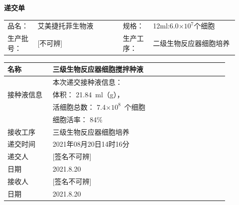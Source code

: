 \documentclass[UTF8,10pt,a4paper,fontset=fandol]{ctexart}
\newcommand{\fieldvalue}[1]{#1}
\newcommand{\handwritten}[1]{#1}
\begin{document}
\begin{center}
\textbf{递交单}

\begin{tabular}{@{}p{0.12\linewidth}p{0.34\linewidth}p{0.12\linewidth}p{0.34\linewidth}@{}}
品名：&
\fieldvalue{艾美捷托菲生物液}
&
规格：&
\fieldvalue{12ml:6.0$\times 10^{7}$个细胞}
\\[0.8em]
生产批号：&
\fieldvalue{\handwritten{[不可辨]}}
&
生产工序：&
\fieldvalue{二级生物反应器细胞培养}
\end{tabular}

\vspace{1em}

\begin{tabular}{|p{0.18\linewidth}|p{0.70\linewidth}|}
\hline
名称&
\fieldvalue{三级生物反应器细胞搅拌种液}
\\ \hline
\multirow{3}{*}{接种液信息}&
本次递交接种液信息：\\
&体积：
\fieldvalue{\handwritten{21.84}}\ ml（g），
\\
&活细胞总数：
\fieldvalue{\handwritten{7.4$\times 10^{8}$}}\ 个细胞
\\
&细胞活率：
\fieldvalue{\handwritten{84\%}}
\\ \hline
接收工序&
\fieldvalue{三级生物反应器细胞培养}
\\ \hline
递交时间&
\fieldvalue{\handwritten{2021年08月20日14时16分}}
\\ \hline
递交人&
\fieldvalue{\handwritten{[签名不可辨]}}
\\
日期&
\fieldvalue{\handwritten{2021.8.20}}
\\ \hline
接收人&
\fieldvalue{\handwritten{[签名不可辨]}}
\\
日期&
\fieldvalue{\handwritten{2021.8.20}}
\\ \hline
\end{tabular}
\end{center}
\end{document}
